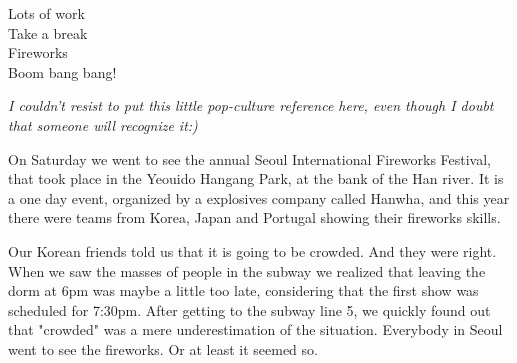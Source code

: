 \begin{post}
	\begin{content}
\begin{blockquote}Lots of work\\
Take a break\\
Fireworks\\
Boom bang bang!
\end{blockquote}

\textit{I couldn't resist to put this little pop-culture reference here, even though I doubt that someone will recognize it:)}

On Saturday we went to see the annual Seoul International Fireworks Festival, that took place in the Yeouido Hangang Park, at the bank of the Han river. It is a one day event, organized by a explosives company called Hanwha, and this year there were teams from Korea, Japan and Portugal showing their fireworks skills.

Our Korean friends told us that it is going to be crowded. And they were right. When we saw the masses of people in the subway we realized that leaving the dorm at 6pm was maybe a little too late, considering that the first show was scheduled for 7:30pm. After getting to the subway line 5, we quickly found out that "crowded" was a mere underestimation of the situation. Everybody in Seoul went to see the fireworks. Or at least it seemed so.

\begin{figure}[h]
\centering
{}
\end{figure}


\end{content}
\end{post}
